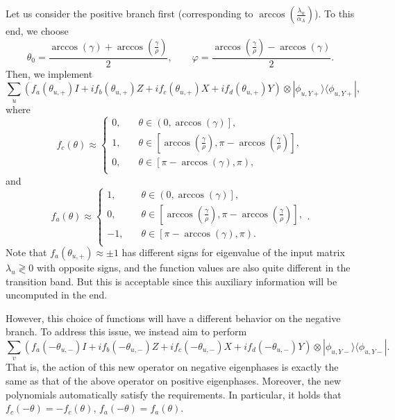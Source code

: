 \documentclass[letterpaper,onecolumn,11pt,accepted=2026-02-14]{quantumarticle}
\theoremstyle{remark}
\theoremstyle{plain}
\newcommand{\ket}[1]{|#1\rangle}
\newcommand{\bra}[1]{\langle#1|}
\newcommand{\ketbra}[2]{\ket{#1}\!\bra{#2}}
\begin{document}
Let us consider the positive branch first (corresponding to $\arccos\left(\frac{\lambda_u}{\alpha_A}\right)$). To this end, we choose
\begin{equation}
    \theta_0=\frac{\arccos\left(\gamma\right)+\arccos\left(\frac{\gamma}{\rho}\right)}{2},\qquad
    \varphi=\frac{\arccos\left(\frac{\gamma}{\rho}\right)-\arccos\left(\gamma\right)}{2}.
\end{equation}
Then, we implement
\begin{equation}
    \sum_u \left(f_{a}(\theta_{u,+})I+if_{b}(\theta_{u,+})Z+if_{c}(\theta_{u,+})X+if_{d}(\theta_{u,+})Y\right)\otimes\ketbra{\phi_{u,Y+}}{\phi_{u,Y+}},
\end{equation}
where
\begin{equation}
    f_c(\theta)\approx
    \begin{cases}
        0,\quad&\theta\in\left(0,\arccos(\gamma)\right],\\
        1,\quad&\theta\in\left[\arccos\left(\frac{\gamma}{\rho}\right),\pi-\arccos\left(\frac{\gamma}{\rho}\right)\right],\\
        0,\quad&\theta\in\left[\pi-\arccos(\gamma),\pi\right),\\
    \end{cases}
\end{equation}
and
\begin{equation}
    f_a(\theta)\approx
    \begin{cases}
        1,\quad&\theta\in\left(0,\arccos(\gamma)\right],\\
        0,\quad&\theta\in\left[\arccos\left(\frac{\gamma}{\rho}\right),\pi-\arccos\left(\frac{\gamma}{\rho}\right)\right],\\
        -1,\quad&\theta\in\left[\pi-\arccos(\gamma),\pi\right).\\
    \end{cases}.
\end{equation}
Note that $f_a(\theta_{u,+})\approx\pm1$ has different signs for eigenvalue of the input matrix $\lambda_u\gtrless0$ with opposite signs, and the function values are also quite different in the transition band. But this is acceptable since this auxiliary information will be uncomputed in the end.

However, this choice of functions will have a different behavior on the negative branch. To address this issue, we instead aim to perform
\begin{equation}
    \sum_v \left(f_{a}(-\theta_{u,-})I+if_{b}(-\theta_{u,-})Z+if_{c}(-\theta_{u,-})X+if_{d}(-\theta_{u,-})Y\right)\otimes\ketbra{\phi_{u,Y-}}{\phi_{u,Y-}}.
\end{equation}
That is, the action of this new operator on negative eigenphases is exactly the same as that of the above operator on positive eigenphases. Moreover, the new polynomials automatically satisfy the requirements. In particular, it holds that $f_c(-\theta)=-f_c(\theta)$, $f_a(-\theta)=f_a(\theta)$.
\end{document}
